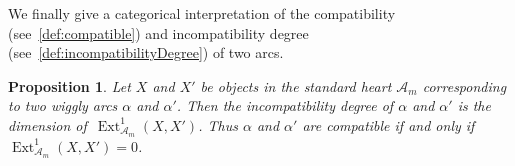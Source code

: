 \documentclass[submission]{FPSAC2025}
\newtheorem{proposition}[theorem]{Proposition}
\theoremstyle{definition}
\DeclareMathOperator{\Ext}{Ext} %
\newcommand{\vincent}[1]{\todo[color=blue!30]{\rm #1 \\ \hfill --- V.}}
\begin{document}
We finally give a categorical interpretation of the compatibility (see~\cref{def:compatible}) and incompatibility degree (see~\cref{def:incompatibilityDegree}) of two arcs.

\begin{proposition}
\label{prop:ext1}
Let \(X\) and \(X'\) be objects in the standard heart \(\mathcal{A}_m\) corresponding to two wiggly arcs \(\alpha\) and \(\alpha'\).
Then the incompatibility degree of \(\alpha\) and \(\alpha'\)  is the dimension of~\(\Ext_{\mathcal{A}_m}^1(X,X')\).
Thus \(\alpha\) and \(\alpha'\) are compatible if and only if~\({\Ext_{\mathcal{A}_m}^1(X, X') = 0}\).
\end{proposition}

\printbibliography
\end{document}
